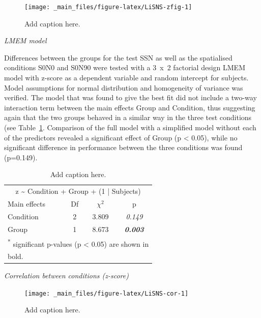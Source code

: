 \documentclass[a4paper, twoside]{templates/ociamthesis}
\begin{document}
\begin{figure}

{\centering \texttt{[image: \_main\_files/figure-latex/LiSNS-zfig-1]} 

}

\caption{Add caption here.}\label{fig:LiSNS-zfig}
\end{figure}

\colorbox[HTML]{CCCCFF}{\emph{LMEM model}}

Differences between the groups for the test SSN as well as the spatialised conditions S0N0 and S0N90 were tested with a 3~x~2 factorial design LMEM model with z-score as a dependent variable and random intercept for subjects. Model assumptions for normal distribution and homogeneity of variance was verified. The model that was found to give the best fit did not include a two-way interaction term between the main effects Group and Condition, thus suggesting again that the two groups behaved in a similar way in the three test conditions (see Table~\ref{tab:LiSNS-zLMEM}. Comparison of the full model with a simplified model without each of the predictors revealed a significant effect of Group (p \textless{} 0.05), while no significant difference in performance between the three conditions was found (p=0.149).

\begin{table}

\caption{\label{tab:LiSNS-zLMEM}Add caption here.}
\centering
\begin{tabular}[t]{lcc>{}c}
\toprule
\multicolumn{4}{c}{z \textasciitilde{} Condition + Group + (1 | Subjects)} \\
\cmidrule(l{3pt}r{3pt}){1-4}
Main effects & Df & $\chi^{2}$ & p\\
\midrule
Condition & 2 & 3.809 & \em{0.149}\\
Group & 1 & 8.673 & \em{\textbf{0.003}}\\
\bottomrule
\multicolumn{4}{l}{\textsuperscript{*} significant p-values (p < 0.05) are shown in}\\
\multicolumn{4}{l}{bold.}\\
\end{tabular}
\end{table}

\colorbox[HTML]{CCCCFF}{\emph{Correlation between conditions (z-score)}}

\begin{figure}

{\centering \texttt{[image: \_main\_files/figure-latex/LiSNS-cor-1]} 

}

\caption{Add caption here.}\label{fig:LiSNS-cor}
\end{figure}
\end{document}
